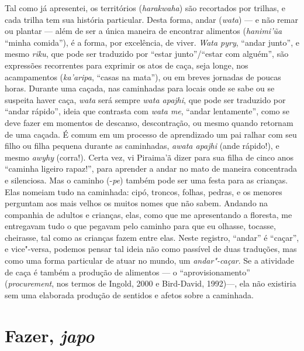 Tal como já apresentei, os territórios (\emph{harakwaha}) são recortados
por trilhas, e cada trilha tem sua história particular. Desta forma,
andar (\emph{wata}) --- e não remar ou plantar --- além de ser a única
maneira de encontrar alimentos (\emph{hanimi'ũa} ``minha comida''), é a
forma, por excelência, de viver. \emph{Wata pyry}, ``andar junto'', e
mesmo \emph{riku}, que pode ser traduzido por ``estar junto''/``estar
com alguém'', são expressões recorrentes para exprimir os atos de caça,
seja longe, nos acampamentos (\emph{ka'aripa}, ``casas na mata''), ou em
breves jornadas de poucas horas. Durante uma caçada, nas caminhadas para
locais onde se sabe ou se suspeita haver caça, \emph{wata} será sempre
\emph{wata apajhi}, que pode ser traduzido por ``andar rápido'', ideia
que contrasta com \emph{wata me}, ``andar lentamente'', como se deve
fazer em momentos de descanso, descontração, ou mesmo quando retornam de
uma caçada. É comum em um processo de aprendizado um pai ralhar com seu
filho ou filha pequena durante as caminhadas, \emph{awata apajhi} (ande
rápido!), e mesmo \emph{awyhy} (corra!). Certa vez, vi Piraima'ã dizer
para sua filha de cinco anos ``caminha ligeiro rapaz!'', para aprender a
andar no mato de maneira concentrada e silenciosa. Mas o caminho
(-\emph{pe}) também pode ser uma festa para as crianças. Elas nomeiam
tudo na caminhada: cipó, troncos, folhas, pedras, e os menores perguntam
aos mais velhos os muitos nomes que não sabem. Andando na companhia de
adultos e crianças, elas, como que me apresentando a floresta, me
entregavam tudo o que pegavam pelo caminho para que eu olhasse, tocasse,
cheirasse, tal como as crianças fazem entre elas. Neste registro,
``andar'' é ``caçar'', e vice"-versa, podemos pensar tal ideia não como
passível de duas traduções, mas como uma forma particular de atuar no
mundo, um \emph{andar"-caçar}. Se a atividade de caça é também a produção
de alimentos --- o ``aprovisionamento'' (\emph{procurement}, nos termos de
Ingold, 2000 e Bird-David, 1992)---, ela não existiria sem uma elaborada
produção de sentidos e afetos sobre a caminhada.

\section{Fazer, \emph{japo}}\label{fazer-japo}

